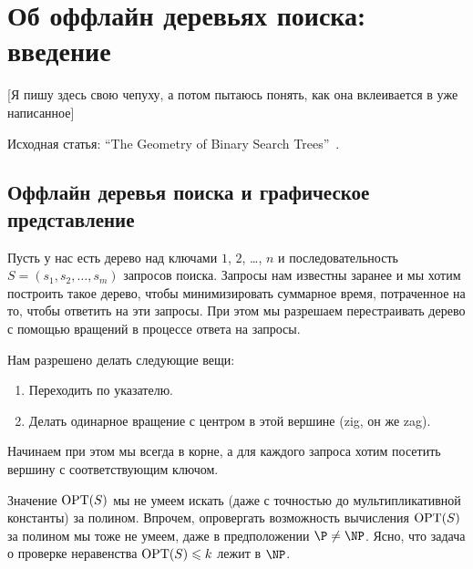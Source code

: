 \section{Об оффлайн деревьях поиска: введение}

[Я пишу здесь свою чепуху, а потом пытаюсь понять, как она вклеивается в уже написанное]

Исходная статья: ``The Geometry of Binary Search Trees''~\cite{demaine2009geometry}.

\subsection{Оффлайн деревья поиска и графическое представление}

Пусть у нас есть дерево над ключами $1$, $2$, \ldots, $n$ и последовательность $S = (s_1, s_2, \ldots, s_m)$ запросов поиска. Запросы нам известны заранее и мы хотим построить такое дерево, чтобы минимизировать суммарное время, потраченное на то, чтобы ответить на эти запросы. 
При этом мы разрешаем перестраивать дерево с помощью вращений в процессе 
ответа на запросы.

Нам разрешено делать следующие вещи:
\begin{enumerate}
\item Переходить по указателю.
\item Делать одинарное вращение с центром в этой вершине (zig, он же zag).
\end{enumerate}

Начинаем при этом мы всегда в корне, а для каждого запроса хотим посетить вершину
с соответствующим ключом.




Значение 
$\operatorname{OPT}(S)$ мы не умеем искать (даже с точностью до мультипликативной
константы) за полином. Впрочем, опровергать возможность вычисления $\operatorname{OPT}(S)$ 
за полином мы тоже не умеем, даже в предположении $\P \neq \NP$. Ясно,
что задача о проверке неравенства $\operatorname{OPT}(S) \leqslant k$ лежит в $\NP$.

